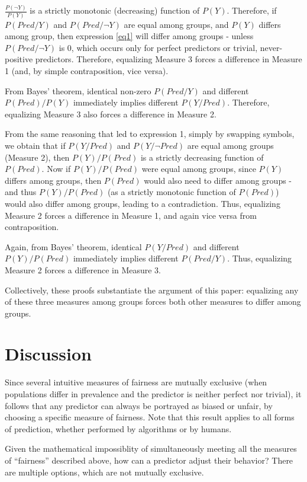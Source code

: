 \documentclass[twocolumn]{article}
\begin{document}
$\frac{P(\neg Y)}{P(Y)}$ is a strictly monotonic (decreasing) function of $P(Y)$. Therefore, if $P(Pred/Y)$ and $P(Pred/\neg Y)$ are equal among groups, and $P(Y)$ differs among group, then expression \ref{eq1} will differ among groups - unless $P(Pred / \neg Y)$ is 0, which occurs only for perfect predictors or trivial, never-positive predictors. Therefore, equalizing Measure 3 forces a difference in Measure 1 (and, by simple contraposition, vice versa).

From Bayes' theorem, identical non-zero $P(Pred/Y)$ and different $P(Pred)/P(Y)$ immediately implies different $P(Y/Pred)$. Therefore, equalizing Measure 3 also forces a difference in Measure 2.

From the same reasoning that led to expression 1, simply by swapping symbols,
we obtain that if $P(Y/Pred)$ and $P(Y/\neg Pred)$ are equal among
groups (Measure 2), then $P(Y)/P(Pred)$ is a strictly decreasing
function of $P(Pred)$. Now if $P(Y)/P(Pred)$ were equal among
groups, since $P(Y)$ differs among groups, then $P(Pred)$ would also
need to differ among groups - and thus $P(Y)/P(Pred)$ (as a strictly monotonic
function of $P(Pred)$) would also differ among groups, leading to a
contradiction. Thus, equalizing Measure 2 forces a difference in Measure 1, and
again vice versa from contraposition.

Again, from Bayes' theorem, identical $P(Y/ Pred)$ and different $P(Y)/P(Pred)$ immediately implies different $P(Pred/Y)$. Thus, equalizing Measure 2 forces a difference in Measure 3. 

Collectively, these proofs substantiate the argument of this paper: equalizing any of these three measures among groups forces both other measures to differ among groups.


\section{Discussion}

Since several intuitive measures of fairness are mutually exclusive (when populations differ in prevalence and the predictor is neither perfect nor trivial), it follows that any predictor can always be portrayed as biased or unfair, by choosing a specific measure of fairness. Note that this result applies to all forms of prediction, whether performed by algorithms or by humans.

Given the mathematical impossiblity of simultaneously meeting all the measures of
``fairness'' described above, how can a predictor adjust their behavior? There are multiple
options, which are not mutually exclusive.
\end{document}
